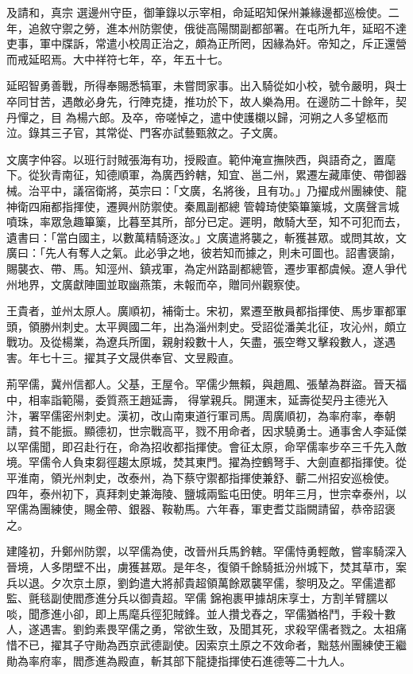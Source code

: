 \begin{pinyinscope}
 及請和，真宗
 選邊州守臣，御筆錄以示宰相，命延昭知保州兼緣邊都巡檢使。二年，追敘守禦之勞，進本州防禦使，俄徙高陽關副都部署。在屯所九年，延昭不達吏事，軍中牒訴，常遣小校周正治之，頗為正所罔，因緣為奸。帝知之，斥正還營而戒延昭焉。大中祥符七年，卒，年五十七。



 延昭智勇善戰，所得奉賜悉犒軍，未嘗問家事。出入騎從如小校，號令嚴明，與士卒同甘苦，遇敵必身先，行陣克捷，推功於下，故人樂為用。在邊防二十餘年，契丹憚之，目
 為楊六郎。及卒，帝嗟悼之，遣中使護櫬以歸，河朔之人多望柩而泣。錄其三子官，其常從、門客亦試藝甄敘之。子文廣。



 文廣字仲容。以班行討賊張海有功，授殿直。範仲淹宣撫陜西，與語奇之，置麾下。從狄青南征，知德順軍，為廣西鈐轄，知宜、邕二州，累遷左藏庫使、帶御器械。治平中，議宿衛將，英宗曰：「文廣，名將後，且有功。」乃擢成州團練使、龍神衛四廂都指揮使，遷興州防禦使。秦鳳副都總
 管韓琦使築篳篥城，文廣聲言城噴珠，率眾急趣篳篥，比暮至其所，部分已定。遲明，敵騎大至，知不可犯而去，遺書曰：「當白國主，以數萬精騎逐汝。」文廣遣將襲之，斬獲甚眾。或問其故，文廣曰：「先人有奪人之氣。此必爭之地，彼若知而據之，則未可圖也。詔書褒諭，賜襲衣、帶、馬。知涇州、鎮戎軍，為定州路副都總管，遷步軍都虞候。遼人爭代州地界，文廣獻陣圖並取幽燕策，未報而卒，贈同州觀察使。



 王貴者，並州太原人。廣順初，補衛士。宋初，累遷至散員都指揮使、馬步軍都軍頭，領勝州刺史。太平興國二年，出為淄州刺史。受詔從潘美北征，攻沁州，頗立戰功。及從楊業，為遼兵所圍，親射殺數十人，矢盡，張空弮又擊殺數人，遂遇害。年七十三。擢其子文晟供奉官、文昱殿直。



 荊罕儒，冀州信都人。父基，王屋令。罕儒少無賴，與趙鳳、張輦為群盜。晉天福中，相率詣範陽，委質燕王趙延壽，
 得掌親兵。開運末，延壽從契丹主德光入汴，署罕儒密州刺史。漢初，改山南東道行軍司馬。周廣順初，為率府率，奉朝請，貧不能振。顯德初，世宗戰高平，戮不用命者，因求驍勇士。通事舍人李延傑以罕儒聞，即召赴行在，命為招收都指揮使。會征太原，命罕儒率步卒三千先入敵境。罕儒令人負束芻徑趨太原城，焚其東門。擢為控鶴弩手、大劍直都指揮使。從平淮南，領光州刺史，改泰州，為下蔡守禦都指揮使兼舒、蘄二州招安巡檢使。
 四年，泰州初下，真拜刺史兼海陵、鹽城兩監屯田使。明年三月，世宗幸泰州，以罕儒為團練使，賜金帶、銀器、鞍勒馬。六年春，軍吏耆艾詣闕請留，恭帝詔褒之。



 建隆初，升鄭州防禦，以罕儒為使，改晉州兵馬鈐轄。罕儒恃勇輕敵，嘗率騎深入晉境，人多閉壁不出，虜獲甚眾。是年冬，復領千餘騎抵汾州城下，焚其草市，案兵以退。夕次京土原，劉鈞遣大將郝貴超領萬餘眾襲罕儒，黎明及之。罕儒遣都監、氈毯副使閻彥進分兵以御貴超。罕儒
 錦袍裹甲據胡床享士，方割羊臂臑以啖，聞彥進小卻，即上馬麾兵徑犯賊鋒。並人攢戈舂之，罕儒猶格鬥，手殺十數人，遂遇害。劉鈞素畏罕儒之勇，常欲生致，及聞其死，求殺罕儒者戮之。太祖痛惜不已，擢其子守勛為西京武德副使。因索京土原之不效命者，黜慈州團練使王繼勛為率府率，閻彥進為殿直，斬其部下龍捷指揮使石進德等二十九人。




\end{pinyinscope}
